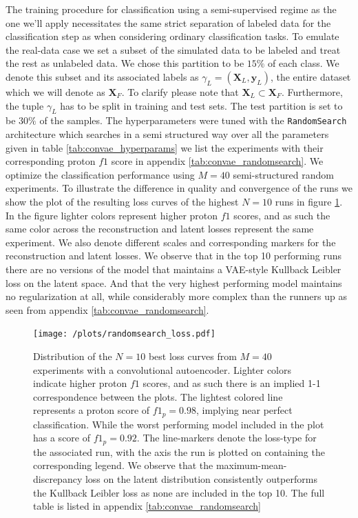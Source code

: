 The training procedure for classification using a semi-supervised regime as the one we'll apply necessitates the same strict separation of labeled data for the classification step as when considering ordinary classification tasks. To emulate the real-data case we set a subset of the simulated data to be labeled and treat the rest as unlabeled data. We chose this partition to be $15\%$ of each class. We denote this subset and its associated labels as $\gamma_L=(\mathbf{X}_L, \mathbf{y}_L)$, the entire dataset which we will denote as $\mathbf{X}_F$. To clarify please note that $\mathbf{X}_L \subset \mathbf{X}_F$. Furthermore, the tuple $\gamma_L$ has to be split in training and test sets. The test partition is set to be $30\%$ of the samples. The hyperparameters were tuned with the \lstinline{RandomSearch} architecture which searches in a semi structured way over all the parameters given in table \ref{tab:convae_hyperparams} we list the experiments with their corresponding proton $f1$ score in appendix \ref{tab:convae_randomsearch}. We optimize the classification performance using $M=40$ semi-structured random experiments. To illustrate the difference in quality and convergence of the runs we show the plot of the resulting loss curves of the highest $N=10$ runs in figure \ref{fig:sim_clf_loss}. In the figure lighter colors represent higher proton $f1$ scores, and as such the same color across the reconstruction and latent losses represent the same experiment. We also denote different scales and corresponding markers for the reconstruction and latent losses. We observe that in the top 10 performing runs there are no versions of the model that maintains a VAE-style Kullback Leibler loss on the latent space. And that the very highest performing model maintains no regularization at all, while considerably more complex than the runners up as seen from appendix \ref{tab:convae_randomsearch}.

\begin{figure}[H]
\centering
\texttt{[image: /plots/randomsearch\_loss.pdf]}
\caption[Randomsearch loss curves for CONV-AE on simulated AT-TPC data]{Distribution of the $N=10$ best loss curves from $M=40$ experiments with a convolutional autoencoder. Lighter colors indicate higher proton $f1$ scores, and as such there is an implied 1-1 correspondence between the plots. The lightest colored line represents a proton score of $f1_p = 0.98$, implying near perfect classification. While the worst performing model included in the plot has a score of $f1_p = 0.92$. The line-markers denote the loss-type for the associated run, with the axis the run is plotted on containing the corresponding legend. We observe that the maximum-mean-discrepancy loss on the latent distribution consistently outperforms the Kullback Leibler loss as none are included in the top 10. The full table is listed in appendix \ref{tab:convae_randomsearch}}\label{fig:sim_clf_loss}
\end{figure}


